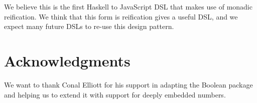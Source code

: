\documentclass{llncs}
\begin{document}
We believe this is the first Haskell to JavaScript DSL that 
makes use of monadic reification. We think that this form
is reification gives a useful DSL, and we expect many future
DSLs to re-use this design pattern.

%

\section{Acknowledgments}

We want to thank Conal Elliott for his support in adapting 
the Boolean package \cite{project:boolean} and helping us to
extend it with support for deeply embedded numbers.

%
%


\vspace{-0.5cm} %
\end{document}
